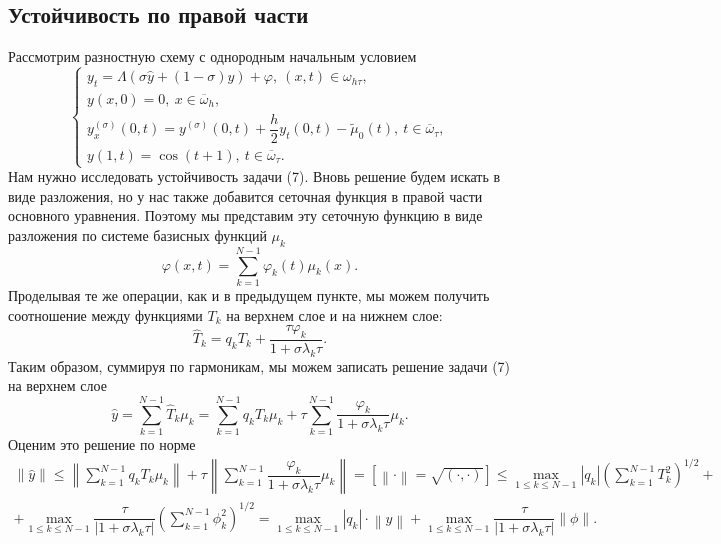 \documentclass[a4paper, 12pt]{article}
\newcommand\Norm[1]{\left\| #1 \right\|}
\begin{document}
    \subsection*{Устойчивость по правой части}
    Рассмотрим разностную схему с однородным начальным условием
    \begin{equation}
    	\begin{cases}
    		y_t = \Lambda(\sigma \hat y + (1-\sigma)y) + \varphi,\ (x,t)\in \omega_{h\tau},\\
    		y(x,0) = 0,\ x \in \overline \omega_h,\\
    		y_x^{(\sigma)}(0,t) = y^{(\sigma)}(0,t) + \dfrac h2 y_t(0,t) - \tilde \mu_0(t),\ t \in \overline \omega_\tau,\\ 
    		y(1,t) = \cos(t+1),\ t \in \overline \omega_\tau.
    	\end{cases}
    \end{equation}
    Нам нужно исследовать устойчивость задачи (7). Вновь решение будем искать в виде разложения, но у нас также добавится сеточная функция в правой части основного уравнения. Поэтому мы представим эту сеточную функцию в виде разложения по системе базисных функций $\mu_k$
    $$\varphi(x,t) = \sum_{k=1}^{N-1}\varphi_k(t)\mu_k(x).$$
    Проделывая те же операции, как и в предыдущем пункте, мы можем получить соотношение между функциями $T_k$ на верхнем слое и на нижнем слое:
    \begin{equation}
    	\hat T_k = q_k T_k + \dfrac{\tau \varphi_k}{1 + \sigma \lambda_k \tau}.
    \end{equation}
    Таким образом, суммируя по гармоникам, мы можем записать решение задачи (7) на верхнем слое
    $$\hat{{ y}} = \sum_{k=1}^{N-1}\hat T_k \mu_k = \sum_{k=1}^{N-1}q_kT_k\mu_k + \tau \sum_{k=1}^{N-1}\dfrac{\varphi_k}{1 + \sigma \lambda_k \tau}\mu_k.$$
    Оценим это решение по норме
    \begin{multline*}
    	\Norm {\hat{{ y}}}\leq \Norm{\sum_{k=1}^{N-1}q_kT_k\mu_k } + \tau \Norm{ \sum_{k=1}^{N-1}\dfrac{\varphi_k}{1 + \sigma \lambda_k \tau}\mu_k} = \left[\Norm{\cdot} = \sqrt{(\cdot, \cdot )}\right]\leq \underset{1\leq k \leq N-1}{\max} |q_k| \left(\sum_{k=1}^{N-1}T_k^2\right)^{1/2} + \\ +
    	\underset{1\leq k \leq N-1}{\max} \dfrac{\tau}{|1+\sigma \lambda_k \tau|} \left(\sum_{k=1}^{N-1}\phi_k^2\right)^{1/2} = \underset{1\leq k \leq N-1}{\max} |q_k|\cdot \Norm{{ y}}  +
    	\underset{1\leq k \leq N-1}{\max} \dfrac{\tau}{|1+\sigma \lambda_k \tau|} \Norm{\phi}.
    \end{multline*}
\end{document}
